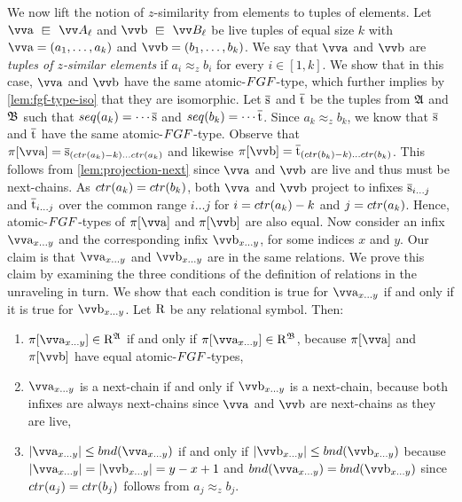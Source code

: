 We now lift the notion of $z$-similarity from elements to tuples of elements.
Let $\elemtuptuplea \sqin \unraveldom{A}_{\ell}$ and $\elemtuptupleb \sqin \unraveldom{B}_{\ell}$ be live tuples of equal size $k$ with $\elemtuptuplea = (a_{1}, \ldots, a_{k})$ and $\elemtuptupleb = (b_{1}, \ldots, b_{k})$.
We say that $\elemtuptuplea$ and $\elemtuptupleb$ are \emph{tuples of $z$-similar elements} if $a_{i} \approx_{z} b_{i}$ for every $i \in [1,k]$.
We show that in this case, $\elemtuptuplea$ and $\elemtuptupleb$ have the same atomic-$\FGF$-type, which further implies by \cref{lem:fgf-type-iso} that they are isomorphic.
Let $\overline{\mathrm{s}}$ and $\overline{\mathrm{t}}$ be the tuples from ${\mathfrak{A}}$ and ${\mathfrak{B}}$ such that $\seq{a_{k}} = \cdots \elemtuples$ and $\seq{b_{k}} = \cdots \elemtuplet$.
Since $a_{k} \approx_z b_{k}$, we know that $\overline{\mathrm{s}}$ and $\overline{\mathrm{t}}$ have the same atomic-$\FGF$-type.
Observe that $\pi[\elemtuptuplea] = \elemtuples_{(\ctr{a_{k}}-k)\ldots{}\ctr{a_{k}}}$ and likewise $\pi[\elemtuptupleb] = \elemtuplet_{(\ctr{b_{k}}-k)\ldots{}\ctr{b_{k}}}$.
This follows from \cref{lem:projection-next} since $\elemtuptuplea$ and $\elemtuptupleb$ are live and thus must be next-chains.
As $\ctr{a_{k}} = \ctr{b_{k}}$, both $\elemtuptuplea$ and $\elemtuptupleb$ project to infixes $\overline{\mathrm{s}}_{i\ldots{}j}$ and $\overline{\mathrm{t}}_{i\ldots{}j}$ over the common range $i\ldots{}j$ for $i = \ctr{a_{k}} - k$ and $j = \ctr{a_{k}}$.
Hence, atomic-$\FGF$-types of $\pi[\elemtuptuplea]$ and $\pi[\elemtuptupleb]$ are also equal.
Now consider an infix $\elemtuptuplea_{x\ldots{}y}$ and the corresponding infix $\elemtuptupleb_{x\ldots{}y}$, for some indices $x$ and $y$.
Our claim is that $\elemtuptuplea_{x\ldots{}y}$ and $\elemtuptupleb_{x\ldots{}y}$ are in the same relations.
We prove this claim by examining the three conditions of the definition of relations in the unraveling in turn.
We show that each condition is true for $\elemtuptuplea_{x\ldots{}y}$ if and only if it is true for $\elemtuptupleb_{x\ldots{}y}$.
Let $\mathrm{R}$ be any relational symbol. Then:
\begin{enumerate}
  \item $\pi[\elemtuptuplea_{x\ldots{}y}] \in \relR^{\str{A}}$ if and only if $\pi[\elemtuptuplea_{x\ldots{}y}] \in \relR^{\str{B}}$, because $\pi[\elemtuptuplea]$ and $\pi[\elemtuptupleb]$ have equal atomic-$\FGF$-types,
  \item $\elemtuptuplea_{x\ldots{}y}$ is a next-chain if and only if $\elemtuptupleb_{x\ldots{}y}$ is a next-chain, because both infixes are always next-chains since $\elemtuptuplea$ and $\elemtuptupleb$ are next-chains as they are live,
  \item $|\elemtuptuplea_{x\ldots{}y}| \le \bound{\elemtuptuplea_{x\ldots{}y}}$ if and only if $|\elemtuptupleb_{x\ldots{}y}| \le \bound{\elemtuptupleb_{x\ldots{}y}}$ because $|\elemtuptuplea_{x\ldots{}y}| = |\elemtuptupleb_{x\ldots{}y}| = y-x+1$ and $\bound{\elemtuptuplea_{x\ldots{}y}} = \bound{\elemtuptupleb_{x\ldots{}y}}$ since $\ctr{a_{j}} = \ctr{b_{j}}$ follows from $a_{j} \approx_{z} b_{j}$.
\end{enumerate}
